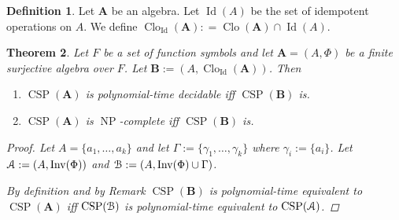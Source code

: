 \documentclass{amsart}
\theoremstyle{plain}
\newtheorem{theorem}{Theorem}[section]
\theoremstyle{definition}
\newtheorem{definition}[theorem]{Definition}
\theoremstyle{remark}
\DeclareMathOperator{\Clo}{Clo}
\DeclareMathOperator{\CSP}{CSP}
\DeclareMathOperator{\Inv}{Inv}
\DeclareMathOperator{\NP}{NP}
\DeclareMathOperator{\Id}{Id}
\begin{document}
\begin{definition}
    Let $\mathbf{A}$ be an algebra. 
    Let $\Id(A)$ be the set of idempotent operations on $A$. 
    We define $\Clo_{\Id}(\mathbf{A}): = \Clo(\mathbf{A}) \cap \Id(A)$. 
\end{definition}

\begin{theorem}
    Let $F$ be a set of function symbols and 
    let $\mathbf{A}=(A, \Phi)$  be a finite surjective algebra over $F$.
    Let $\mathbf{B}:=(A, \Clo_{\Id}(\mathbf{A}))$. 
    Then   
    \begin{enumerate}
        \item $\CSP(\mathbf{A})$ is polynomial-time decidable iff $\CSP(\mathbf{B})$ is. 
        \item $\CSP(\mathbf{A})$ is $\NP$-complete iff $\CSP(\mathbf{B})$ is. 
    \end{enumerate}
\begin{proof}
    Let $A=\{a_1, \ldots, a_k\}$ and let $\Gamma:=\{\gamma_1, \ldots, \gamma_k\}$ where $\gamma_i :=\{a_i\}$. 
    Let $\EuScript{A}:=(A, \Inv(\Phi))$ and $\EuScript{B}:=(A, \Inv(\Phi) \cup \Gamma )$. 

    By definition and by Remark $\CSP(\mathbf{B})$ is polynomial-time equivalent to $\CSP(\mathbf{A})$ iff 
    $\CSP(\EuScript{B})$ is polynomial-time equivalent to $\CSP(\EuScript{A})$.


\end{proof}
\end{theorem}
\end{document}

